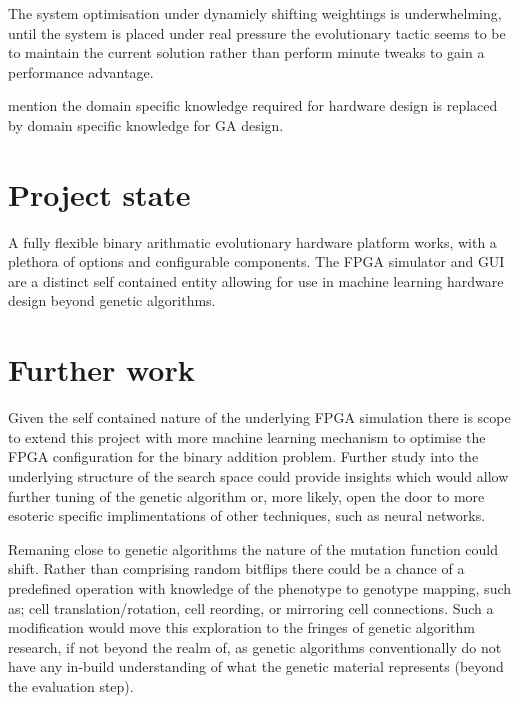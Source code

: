 The system optimisation under dynamicly shifting weightings is underwhelming,
until the system is placed under real pressure the evolutionary tactic seems to be
to maintain the current solution rather than perform minute tweaks to gain a performance
advantage.

\todo mention the domain specific knowledge required for hardware design is
replaced by domain specific knowledge for GA design.

\section{Project state}
A fully flexible binary arithmatic evolutionary hardware platform works, with
a plethora of options and configurable components. The FPGA simulator and GUI are a distinct
self contained entity allowing for use in machine learning hardware design beyond
genetic algorithms.

\section{Further work}
Given the self contained nature of the underlying FPGA simulation there is scope to
extend this project with more machine learning mechanism to optimise the FPGA
configuration for the binary addition problem. Further study into the underlying
structure of the search space could provide insights which would allow further
tuning of the genetic algorithm or, more likely, open the door to more esoteric
specific implimentations of other techniques, such as neural networks.

Remaning close to genetic algorithms the nature of the mutation function
could shift. Rather than comprising random bitflips there could be a chance
of a predefined operation with knowledge of the phenotype to genotype mapping,
such as; cell translation/rotation, cell reording, or mirroring cell connections.
Such a modification would move this exploration to the fringes of genetic algorithm
research, if not beyond the realm of, as genetic algorithms conventionally do not
have any in-build understanding of what the genetic material represents (beyond the
evaluation step).

